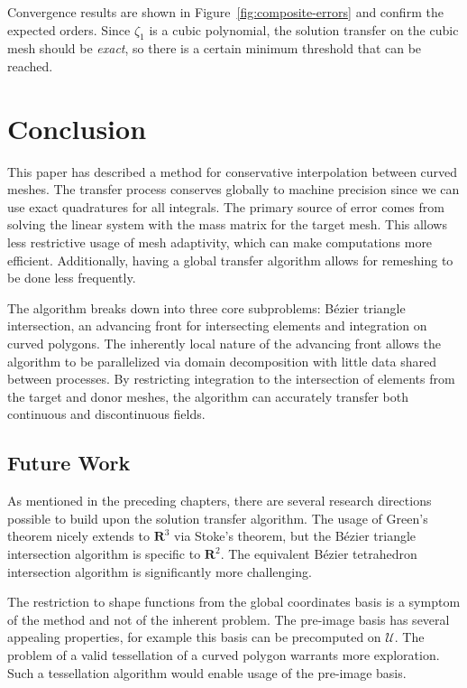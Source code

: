 \documentclass[letterpaper,10pt]{article}
\theoremstyle{definition}
\newcommand{\reals}{\mathbf{R}}
\newcommand{\utri}{\mathcal{U}}
\begin{document}
Convergence results are shown in Figure~\ref{fig:composite-errors}
and confirm the expected orders. Since \(\zeta_1\) is a cubic polynomial,
the solution transfer on the cubic mesh should be \emph{exact}, so there
is a certain minimum threshold that can be reached.

\section{Conclusion}

This paper has described a method for conservative interpolation
between curved meshes. The transfer process conserves globally
to machine precision since we can use exact quadratures for all
integrals. The primary source of error comes from solving the linear
system with the mass matrix for the target mesh. This allows
less restrictive usage of mesh adaptivity, which can make computations
more efficient. Additionally, having a global transfer algorithm
allows for remeshing to be done less frequently.

The algorithm breaks down into three core subproblems: B\'{e}zier triangle
intersection, an advancing front for intersecting elements and
integration on curved polygons. The inherently local nature of the
advancing front allows the algorithm to be parallelized via domain
decomposition with little data shared between processes. By
restricting integration to the intersection of elements from the
target and donor meshes, the algorithm can accurately transfer
both continuous and discontinuous fields.

\subsection{Future Work}

As mentioned in the preceding chapters, there are several research
directions possible to build upon the solution transfer algorithm.
The usage of Green's theorem nicely extends to \(\reals^3\) via
Stoke's theorem, but the B\'{e}zier triangle intersection algorithm
is specific to \(\reals^2\). The equivalent B\'{e}zier tetrahedron
intersection algorithm is significantly more challenging.

The restriction to shape functions from the global coordinates basis
is a symptom of the method and not of the inherent problem. The
pre-image basis has several appealing properties, for example
this basis can be precomputed on \(\utri\). The problem of a
valid tessellation of a curved polygon warrants more exploration.
Such a tessellation algorithm would enable usage of the pre-image
basis.
\end{document}
